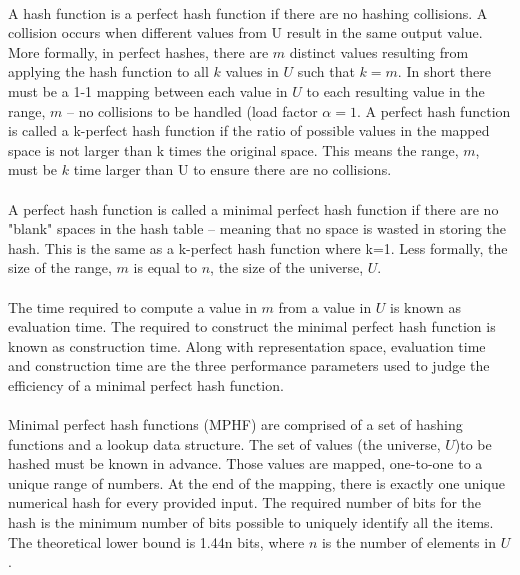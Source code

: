 			\paragraph{} A hash function is a perfect hash function if there are no hashing collisions. A collision occurs when different values from U result in the same output value. More formally, in perfect hashes, there are $m$ distinct values resulting from applying the hash function to all $k$ values in $U$ such that $k=m$.  In short there must be a 1-1 mapping between each value in $U$ to each resulting value in the range, $m$ -- no collisions to be handled (load factor $\alpha = 1$.  A perfect hash function is called a k-perfect hash function if the ratio of possible values in the mapped space is not larger than k times the original space.  This means the range, $m$, must be $k$ time larger than U to ensure there are no collisions.
			\paragraph{} A perfect hash function is called a minimal perfect hash function if there are no "blank" spaces in the hash table -- meaning that no space is wasted in storing the hash.  This is the same as a k-perfect hash function where k=1. Less formally, the size of the range, $m$ is equal to $n$, the size of the universe, $U$.
			\paragraph{}The time required to compute a value in $m$ from a value in $U$ is known as evaluation time.  The required to construct the minimal perfect hash function is known as construction time.  Along with representation space, evaluation time and construction time are the three performance parameters used to judge the efficiency of a minimal perfect hash function.
			\paragraph{} Minimal perfect hash functions (MPHF) are comprised of a set of hashing functions and a lookup data structure.  The set of values (the universe, $U$)to be hashed must be known in advance.  Those values are mapped, one-to-one to a unique range of numbers.  At the end of the mapping, there is exactly one unique numerical hash for every provided input.  The required number of bits for the hash is the minimum number of bits possible to uniquely identify all the items. The theoretical lower bound is 1.44n bits, where $n$ is the number of elements in $U$. 
